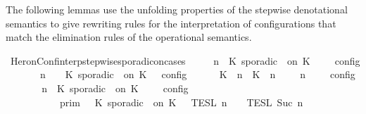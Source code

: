 \begin{isabellebody}
%
\endisatagproof
{\isafoldproof}%
%
\isadelimproof
%
\endisadelimproof
%
\begin{isamarkuptext}%
The following lemmas use the unfolding properties of the stepwise denotational 
  semantics to give rewriting rules for the interpretation of configurations that
  match the elimination rules of the operational semantics.%
\end{isamarkuptext}\isamarkuptrue%
\isamarkupfalse%
\ HeronConf{\isacharunderscore}interp{\isacharunderscore}stepwise{\isacharunderscore}sporadicon{\isacharunderscore}cases{\isacharcolon}\isanewline
\ \ \ {\isacartoucheopen}{\isasymlbrakk}\ {\isasymGamma}{\isacharcomma}\ n\ {\isasymturnstile}\ {\isacharparenleft}{\isacharparenleft}K\ sporadic\ {\isasymtau}\ on\ K\ {\isacharhash}\ {\isasymPsi}{\isacharparenright}\ {\isasymtriangleright}\ {\isasymPhi}\ {\isasymrbrakk}\isactrlsub c\isactrlsub o\isactrlsub n\isactrlsub f\isactrlsub i\isactrlsub g\isanewline
\ \ \ \ {\isacharequal}\ {\isasymlbrakk}\ {\isasymGamma}{\isacharcomma}\ n\ {\isasymturnstile}\ {\isasymPsi}\ {\isasymtriangleright}\ {\isacharparenleft}{\isacharparenleft}K\ sporadic\ {\isasymtau}\ on\ K\ {\isacharhash}\ {\isasymPhi}{\isacharparenright}\ {\isasymrbrakk}\isactrlsub c\isactrlsub o\isactrlsub n\isactrlsub f\isactrlsub i\isactrlsub g\isanewline
\ \ \ \ {\isasymunion}\ {\isasymlbrakk}\ {\isacharparenleft}{\isacharparenleft}K\ {\isasymUp}\ n{\isacharparenright}\ {\isacharhash}\ {\isacharparenleft}K\ {\isasymDown}\ n\ {\isacharat}\ {\isasymtau}{\isacharparenright}\ {\isacharhash}\ {\isasymGamma}{\isacharparenright}{\isacharcomma}\ n\ {\isasymturnstile}\ {\isasymPsi}\ {\isasymtriangleright}\ {\isasymPhi}\ {\isasymrbrakk}\isactrlsub c\isactrlsub o\isactrlsub n\isactrlsub f\isactrlsub i\isactrlsub g{\isacartoucheclose}\isanewline
%
\isadelimproof
%
\endisadelimproof
%
\isatagproof
{}\isamarkupfalse%
\ {\isacharminus}\isanewline
\ \ \isamarkupfalse%
\ {\isacartoucheopen}{\isasymlbrakk}\ {\isasymGamma}{\isacharcomma}\ n\ {\isasymturnstile}\ {\isacharparenleft}K\ sporadic\ {\isasymtau}\ on\ K\ {\isacharhash}\ {\isasymPsi}\ {\isasymtriangleright}\ {\isasymPhi}\ {\isasymrbrakk}\isactrlsub c\isactrlsub o\isactrlsub n\isactrlsub f\isactrlsub i\isactrlsub g\isanewline
\ \ \ \ \ \ \ \ {\isacharequal}\ {\isasymlbrakk}{\isasymlbrakk}\ {\isasymGamma}\ {\isasymrbrakk}{\isasymrbrakk}\isactrlsub p\isactrlsub r\isactrlsub i\isactrlsub m\ {\isasyminter}\ {\isasymlbrakk}{\isasymlbrakk}\ {\isacharparenleft}K\ sporadic\ {\isasymtau}\ on\ K\ {\isacharhash}\ {\isasymPsi}\ {\isasymrbrakk}{\isasymrbrakk}\isactrlsub T\isactrlsub E\isactrlsub S\isactrlsub L\isactrlbsup {\isasymge}\ n\isactrlesup \ {\isasyminter}\ {\isasymlbrakk}{\isasymlbrakk}\ {\isasymPhi}\ {\isasymrbrakk}{\isasymrbrakk}\isactrlsub T\isactrlsub E\isactrlsub S\isactrlsub L\isactrlbsup {\isasymge}\ Suc\ n\isactrlesup {\isacartoucheclose}\isanewline

\end{isabellebody}

